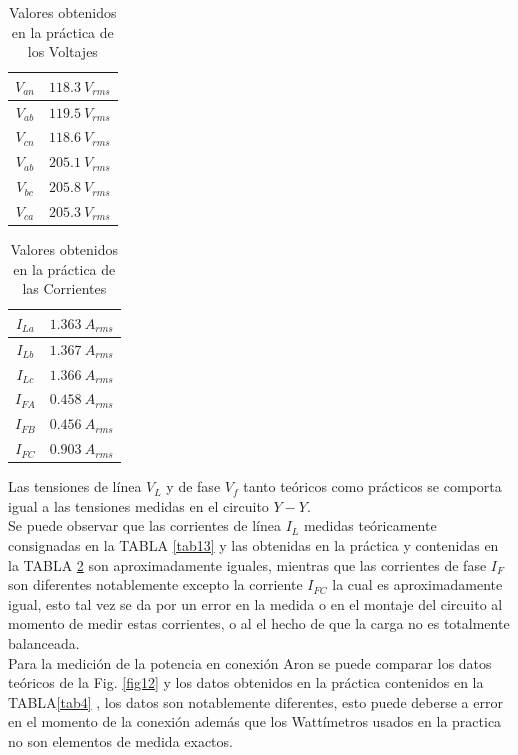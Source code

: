 \documentclass[twocolumn]{IEEEtran}
\begin{document}
\begin{table}[H]
	\centering
\begin{tabular}[c]{|c|c|} \hline
$V_{an}$ & $118.3\ V_{rms}$ \\ \hline
$V_{ab}$ & $119.5\ V_{rms}$ \\ \hline
$V_{cn}$ & $118.6\ V_{rms}$ \\ \hline
$V_{ab}$ & $205.1\ V_{rms}$ \\ \hline
$V_{bc}$ & $205.8\ V_{rms}$ \\ \hline
$V_{ca}$ & $205.3\ V_{rms}$ \\ \hline
\end{tabular}
	\caption{Valores obtenidos en la práctica de los Voltajes}
	\label{tab5}
\end{table}
\begin{table}[H]
	\centering
\begin{tabular}[c]{|c|c|} \hline
$I_{La}$ & $1.363\ A_{rms}$ \\ \hline
$I_{Lb}$ & $1.367\ A_{rms}$ \\ \hline
$I_{Lc}$ & $1.366\ A_{rms}$ \\ \hline
$I_{FA}$ & $0.458\ A_{rms}$ \\ \hline
$I_{FB}$ & $0.456\ A_{rms}$ \\ \hline
$I_{FC}$ & $0.903\ A_{rms}$ \\ \hline
\end{tabular}
	\caption{Valores obtenidos en la práctica de las Corrientes}
	\label{tab6}
\end{table}
\noindent
Las tensiones de línea $V_L$ y de fase $V_f$ tanto teóricos como prácticos se comporta igual a las tensiones medidas en el circuito $Y-Y$.\\
Se puede observar que las corrientes de línea $I_L$ medidas teóricamente  consignadas en la TABLA \ref{tab13} y las obtenidas en la práctica y contenidas en la TABLA \ref{tab6} son aproximadamente iguales, mientras que las corrientes de fase $I_F$  son diferentes notablemente excepto la corriente $I_{FC}$ la cual es aproximadamente igual, esto tal vez se da por un error en la medida  o en el montaje del circuito al momento de medir estas corrientes, o al el hecho de que la carga no es totalmente balanceada.\\
Para la medición de la potencia en conexión Aron se puede comparar los datos teóricos de la Fig. \ref{fig12} y los datos obtenidos en la práctica contenidos en la TABLA\ref{tab4} , los datos son notablemente diferentes, esto puede deberse a error  en el momento de la conexión además que los Wattímetros usados en la practica no son elementos de medida exactos.
\end{document}

